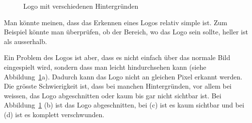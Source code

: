 \documentclass[12pt,a4paper]{report}
\begin{document}
\begin{figure}[h]%
    \centering
    \qquad
    \qquad
    \qquad
    \caption{Logo mit verschiedenen Hintergründen}%
    \label{fig:logo2}%
\end{figure}

Man könnte meinen, dass das Erkennen eines Logos relativ simple ist.
Zum Beispiel könnte man überprüfen, ob der Bereich, wo das Logo sein sollte, heller ist als ausserhalb.

Ein Problem des Logos ist aber, dass es nicht einfach über das normale Bild eingespielt wird, sondern dass man leicht hindurchsehen kann (siehe Abbildung~\ref{fig:logo2}a).
Dadurch kann das Logo nicht an gleichen Pixel erkannt werden.
Die grösste Schwierigkeit ist, dass bei manchen Hintergründen, vor allem bei weissen, das Logo abgeschnitten oder kaum bis gar nicht sichtbar ist.
Bei Abbildung~\ref{fig:logo2} (b) ist das Logo abgeschnitten, bei (c) ist es kaum sichtbar und bei (d) ist es komplett verschwunden.
\end{document}
